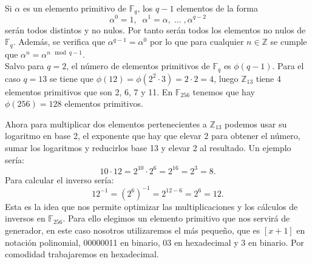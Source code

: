 Si $\alpha$ es un elemento primitivo de $\mathbb{F}_q$, los $q-1$ elementos de la forma\\
$$
	\alpha^0=1,\;\; \alpha^1=\alpha,\;\dots\; ,\alpha^{q-2}
$$
serán todos distintos y no nulos. Por tanto serán todos los elementos no nulos de $\mathbb{F}_q$. Además, se verifica que $\alpha^{q-1}=\alpha^0$ por lo que para cualquier $n \in \mathbb{Z}$ se cumple que $\alpha^n=\alpha^{n\mod q-1}$.\\
Salvo para $q=2$, el número de elementos primitivos de $\mathbb{F}_q$ es $\phi(q-1)$. Para el caso $q=13$ se tiene que $\phi(12)=\phi(2^2\cdot 3)=2\cdot2=4$, luego $\mathbb{Z}_{13}$ tiene 4 elementos primitivos que son 2, 6, 7 y 11. En $\mathbb{F}_{256}$ tenemos que hay $\phi(256)=128$ elementos primitivos.

Ahora para multiplicar dos elementos pertenecientes a $\mathbb{Z}_{13}$ podemos usar su logaritmo en base 2, el exponente que hay que elevar 2 para obtener el número, sumar los logaritmos y reducirlos base 13 y elevar 2 al resultado. Un ejemplo sería:
$$
	10\cdot12=2^{10}\cdot2^{6}=2^{16}=2^3=8.
$$
Para calcular el inverso sería:
$$
	12^{-1}=(2^6)^{-1}=2^{12-6}=2^6=12.
$$
Esta es la idea que nos permite optimizar las multiplicaciones y los cálculos de inversos en $\mathbb{F}_{256}$. Para ello elegimos un elemento primitivo que nos servirá de generador, en este caso nosotros utilizaremos el más pequeño, que es $[x+1]$ en notación polinomial, 00000011 en binario, 03 en hexadecimal y 3 en binario. Por comodidad trabajaremos en hexadecimal. 

